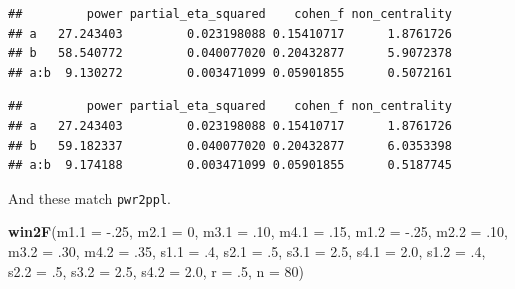 \documentclass[
]{book}
\newenvironment{Shaded}{\begin{snugshade}}{\end{snugshade}}
\newcommand{\DataTypeTok}[1]{\textcolor[rgb]{0.13,0.29,0.53}{#1}}
\newcommand{\DecValTok}[1]{\textcolor[rgb]{0.00,0.00,0.81}{#1}}
\newcommand{\FloatTok}[1]{\textcolor[rgb]{0.00,0.00,0.81}{#1}}
\newcommand{\KeywordTok}[1]{\textcolor[rgb]{0.13,0.29,0.53}{\textbf{#1}}}
\newcommand{\NormalTok}[1]{#1}
\newcommand{\OperatorTok}[1]{\textcolor[rgb]{0.81,0.36,0.00}{\textbf{#1}}}
\newcommand{\OtherTok}[1]{\textcolor[rgb]{0.56,0.35,0.01}{#1}}
\newcommand{\StringTok}[1]{\textcolor[rgb]{0.31,0.60,0.02}{#1}}
\begin{document}
\begin{verbatim}
##         power partial_eta_squared    cohen_f non_centrality
## a   27.243403         0.023198088 0.15410717      1.8761726
## b   58.540772         0.040077020 0.20432877      5.9072378
## a:b  9.130272         0.003471099 0.05901855      0.5072161
\end{verbatim}

\begin{Shaded}
\end{Shaded}

\begin{verbatim}
##         power partial_eta_squared    cohen_f non_centrality
## a   27.243403         0.023198088 0.15410717      1.8761726
## b   59.182337         0.040077020 0.20432877      6.0353398
## a:b  9.174188         0.003471099 0.05901855      0.5187745
\end{verbatim}

And these match \texttt{pwr2ppl}.

\begin{Shaded}
\begin{Highlighting}[]
\KeywordTok{win2F}\NormalTok{(}\DataTypeTok{m1.1 =} \FloatTok{-.25}\NormalTok{, }\DataTypeTok{m2.1 =} \DecValTok{0}\NormalTok{,}
      \DataTypeTok{m3.1 =} \FloatTok{.10}\NormalTok{, }\DataTypeTok{m4.1 =} \FloatTok{.15}\NormalTok{,}
      \DataTypeTok{m1.2 =} \FloatTok{-.25}\NormalTok{, }\DataTypeTok{m2.2 =} \FloatTok{.10}\NormalTok{,}
      \DataTypeTok{m3.2 =} \FloatTok{.30}\NormalTok{, }\DataTypeTok{m4.2 =} \FloatTok{.35}\NormalTok{,}
      \DataTypeTok{s1.1 =} \FloatTok{.4}\NormalTok{, }\DataTypeTok{s2.1 =} \FloatTok{.5}\NormalTok{,}
      \DataTypeTok{s3.1 =} \FloatTok{2.5}\NormalTok{, }\DataTypeTok{s4.1 =} \FloatTok{2.0}\NormalTok{,}
      \DataTypeTok{s1.2 =} \FloatTok{.4}\NormalTok{, }\DataTypeTok{s2.2 =} \FloatTok{.5}\NormalTok{,}
      \DataTypeTok{s3.2 =} \FloatTok{2.5}\NormalTok{, }\DataTypeTok{s4.2 =} \FloatTok{2.0}\NormalTok{,}
      \DataTypeTok{r =} \FloatTok{.5}\NormalTok{, }\DataTypeTok{n =} \DecValTok{80}\NormalTok{)}
\end{Highlighting}
\end{Shaded}
\end{document}
